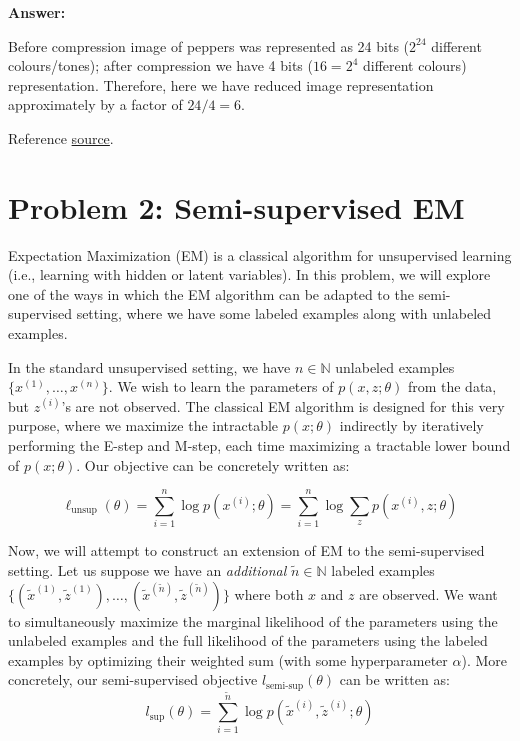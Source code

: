 \documentclass{article}
\begin{document}
\begin{enumerate}[label=\alph*)]
\textbf{Answer:}

Before compression image of peppers was represented as 24 bits ($2^{24}$ different colours/tones); after compression we have 4 bits ($16 = 2^4$ different colours) representation. Therefore, here we have reduced image representation approximately by a factor of  $24/4 = 6$. 

Reference \href{http://preservationtutorial.library.cornell.edu/tutorial/intro/intro-04.html#:~:text=A%20color%20image%20is%20typically,(2%2024%20)%20color%20values}{source}.
\end{enumerate}



\section*{Problem 2: Semi-supervised EM
}

Expectation Maximization (EM) is a classical algorithm for unsupervised learning (i.e., learning with hidden or latent variables). In this problem, we will explore one of the ways in which the EM algorithm can be adapted to the semi-supervised setting, where we have some labeled examples along with unlabeled examples.

In the standard unsupervised setting, we have $n \in \mathbb{N}$ unlabeled examples $\{x^{(1)}, \ldots, x^{(n)}\}$. We wish to learn the parameters of $p(x, z; \theta)$ from the data, but $z^{(i)}$'s are not observed. The classical EM algorithm is designed for this very purpose, where we maximize the intractable $p(x; \theta)$ indirectly by iteratively performing the E-step and M-step, each time maximizing a tractable lower bound of $p(x; \theta)$. Our objective can be concretely written as:

\[
\ell_{\text{unsup}}(\theta) = \sum_{i=1}^{n} \log p(x^{(i)}; \theta) = \sum_{i=1}^{n} \log \sum_{z}  p(x^{(i)}, z; \theta)
\]

Now, we will attempt to construct an extension of EM to the semi-supervised setting. Let us suppose we have an \textit{additional} $\tilde{n} \in \mathbb{N}$ labeled examples $\{(\tilde{x}^{(1)},\tilde{z}^{(1)}), \ldots, (\tilde{x}^{(\tilde{n})},\tilde{z}^{(\tilde{n})})\}$ where both $x$ and $z$ are observed. We want to simultaneously maximize the marginal likelihood of the parameters using the unlabeled examples and the full likelihood of the parameters using the labeled examples by optimizing their weighted sum (with some hyperparameter $\alpha$). More concretely, our semi-supervised objective $l_{\text{semi-sup}}(\theta)$ can be written as:
\[
l_{\text{sup}}(\theta) = \sum_{i=1}^{\tilde{n}} \log p(\tilde{x}^{(i)}, \tilde{z}^{(i)}; \theta)
\]
\end{document}
